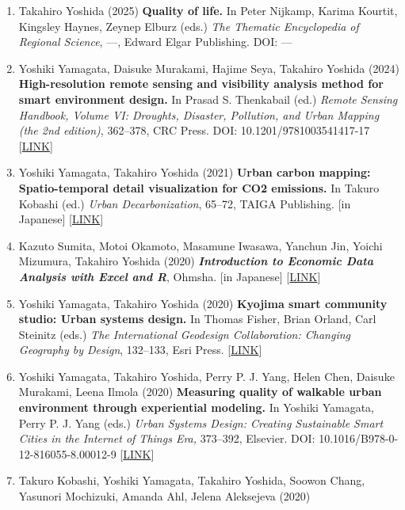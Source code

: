 \documentclass[
]{book}
\providecommand{\tightlist}{%
  \setlength{\itemsep}{0pt}\setlength{\parskip}{0pt}}
\begin{document}
\begin{enumerate}
\def\labelenumi{\arabic{enumi}.}
\tightlist
\item
  Takahiro Yoshida (2025)
  \textbf{Quality of life.}
  In Peter Nijkamp, Karima Kourtit, Kingsley Haynes, Zeynep Elburz (eds.)
  \emph{The Thematic Encyclopedia of Regional Science}, ---, Edward Elgar Publishing.
  DOI: ---
\item
  Yoshiki Yamagata, Daisuke Murakami, Hajime Seya, Takahiro Yoshida (2024)
  \textbf{High-resolution remote sensing and visibility analysis method for smart environment design.}
  In Prasad S. Thenkabail (ed.)
  \emph{Remote Sensing Handbook, Volume VI: Droughts, Disaster, Pollution, and Urban Mapping (the 2nd edition)}, 362--378, CRC Press.
  DOI: 10.1201/9781003541417-17 {[}\href{https://doi.org/10.1201/9781003541417-17}{LINK}{]}
\item
  Yoshiki Yamagata, Takahiro Yoshida (2021)
  \textbf{Urban carbon mapping: Spatio-temporal detail visualization for CO2 emissions.}
  In Takuro Kobashi (ed.)
  \emph{Urban Decarbonization}, 65--72, TAIGA Publishing.
  {[}in Japanese{]} {[}\href{https://www.taigashuppan.co.jp/products/detail/552}{LINK}{]}
\item
  Kazuto Sumita, Motoi Okamoto, Masamune Iwasawa, Yanchun Jin, Yoichi Mizumura, Takahiro Yoshida (2020)
  \textbf{\emph{Introduction to Economic Data Analysis with Excel and R}}, Ohmsha.
  {[}in Japanese{]} {[}\href{https://www.ohmsha.co.jp/book/9784274225628/}{LINK}{]}
\item
  Yoshiki Yamagata, Takahiro Yoshida (2020)
  \textbf{Kyojima smart community studio: Urban systems design.}
  In Thomas Fisher, Brian Orland, Carl Steinitz (eds.)
  \emph{The International Geodesign Collaboration: Changing Geography by Design}, 132--133, Esri Press.
  {[}\href{https://esripress.esri.com/display/index.cfm?fuseaction=display&websiteID=388&moduleID=0}{LINK}{]}
\item
  Yoshiki Yamagata, Takahiro Yoshida, Perry P. J. Yang, Helen Chen, Daisuke Murakami, Leena Ilmola (2020)
  \textbf{Measuring quality of walkable urban environment through experiential modeling.}
  In Yoshiki Yamagata, Perry P. J. Yang (eds.)
  \emph{Urban Systems Design: Creating Sustainable Smart Cities in the Internet of Things Era,} 373--392, Elsevier.
  DOI: 10.1016/B978-0-12-816055-8.00012-9 {[}\href{https://www.elsevier.com/books/urban-systems-design/yamagata/978-0-12-816055-8}{LINK}{]}
\item
  Takuro Kobashi, Yoshiki Yamagata, Takahiro Yoshida, Soowon Chang, Yasunori Mochizuki, Amanda Ahl, Jelena Aleksejeva (2020)

\end{enumerate}
\end{document}
